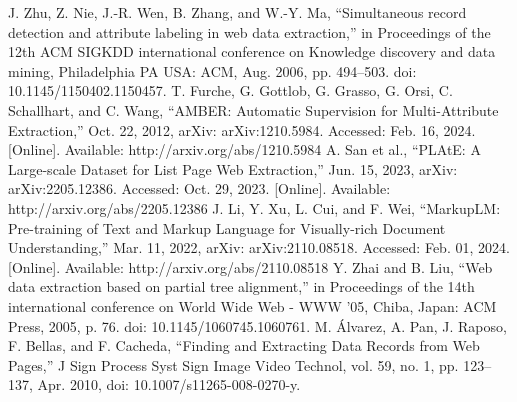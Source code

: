 \begin{thebibliography}{00}
 J. Zhu, Z. Nie, J.-R. Wen, B. Zhang, and W.-Y. Ma, “Simultaneous record detection and attribute labeling in web data extraction,” in Proceedings of the 12th ACM SIGKDD international conference on Knowledge discovery and data mining, Philadelphia PA USA: ACM, Aug. 2006, pp. 494–503. doi: 10.1145/1150402.1150457.
 T. Furche, G. Gottlob, G. Grasso, G. Orsi, C. Schallhart, and C. Wang, “AMBER: Automatic Supervision for Multi-Attribute Extraction,” Oct. 22, 2012, arXiv: arXiv:1210.5984. Accessed: Feb. 16, 2024. [Online]. Available: http://arxiv.org/abs/1210.5984
 A. San et al., “PLAtE: A Large-scale Dataset for List Page Web Extraction,” Jun. 15, 2023, arXiv: arXiv:2205.12386. Accessed: Oct. 29, 2023. [Online]. Available: http://arxiv.org/abs/2205.12386
 J. Li, Y. Xu, L. Cui, and F. Wei, “MarkupLM: Pre-training of Text and Markup Language for Visually-rich Document Understanding,” Mar. 11, 2022, arXiv: arXiv:2110.08518. Accessed: Feb. 01, 2024. [Online]. Available: http://arxiv.org/abs/2110.08518
 Y. Zhai and B. Liu, “Web data extraction based on partial tree alignment,” in Proceedings of the 14th international conference on World Wide Web  - WWW ’05, Chiba, Japan: ACM Press, 2005, p. 76. doi: 10.1145/1060745.1060761.
 M. Álvarez, A. Pan, J. Raposo, F. Bellas, and F. Cacheda, “Finding and Extracting Data Records from Web Pages,” J Sign Process Syst Sign Image Video Technol, vol. 59, no. 1, pp. 123–137, Apr. 2010, doi: 10.1007/s11265-008-0270-y.
\end{thebibliography}
